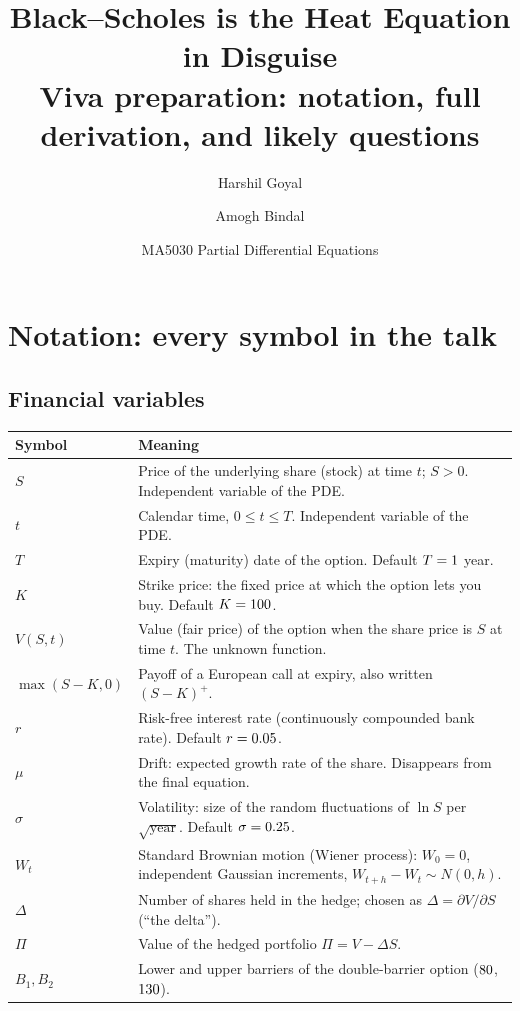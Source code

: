 \documentclass[11pt]{article}
\title{Black--Scholes is the Heat Equation in Disguise\\[4pt]
\large Viva preparation: notation, full derivation, and likely questions}
\author{Harshil Goyal \and Amogh Bindal}
\date{MA5030 Partial Differential Equations}
\theoremstyle{definition}
\begin{document}
\maketitle
\tableofcontents

\section{Notation: every symbol in the talk}

\subsection*{Financial variables}
\begin{center}
\renewcommand{\arraystretch}{1.25}
\begin{tabular}{@{}lp{}@{}}
\toprule
Symbol & Meaning \\
\midrule
$S$ & Price of the underlying share (stock) at time $t$; $S>0$. Independent variable of the PDE. \\
$t$ & Calendar time, $0\le t\le T$. Independent variable of the PDE. \\
$T$ & Expiry (maturity) date of the option. Default $T=\num{1}$ year. \\
$K$ & Strike price: the fixed price at which the option lets you buy. Default $K=\num{100}$. \\
$V(S,t)$ & Value (fair price) of the option when the share price is $S$ at time $t$. The unknown function. \\
$\max(S-K,0)$ & Payoff of a European call at expiry, also written $(S-K)^+$. \\
$r$ & Risk-free interest rate (continuously compounded bank rate). Default $r=\num{0.05}$. \\
$\mu$ & Drift: expected growth rate of the share. Disappears from the final equation. \\
$\sigma$ & Volatility: size of the random fluctuations of $\ln S$ per $\sqrt{\text{year}}$. Default $\sigma=\num{0.25}$. \\
$W_t$ & Standard Brownian motion (Wiener process): $W_0=0$, independent Gaussian increments, $W_{t+h}-W_t\sim N(0,h)$. \\
$\Delta$ & Number of shares held in the hedge; chosen as $\Delta=\partial V/\partial S$ (``the delta''). \\
$\Pi$ & Value of the hedged portfolio $\Pi=V-\Delta S$. \\
$B_1,B_2$ & Lower and upper barriers of the double-barrier option ($\num{80}$, $\num{130}$). \\
\bottomrule
\end{tabular}
\end{center}
\end{document}
